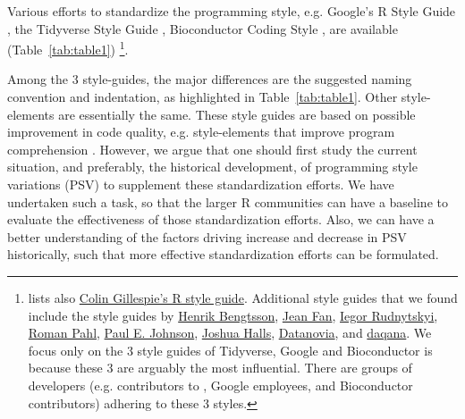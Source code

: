 Various efforts to standardize the programming style, e.g. Google's R Style Guide \citep{google}, the Tidyverse Style Guide \citep{tidyverse}, Bioconductor Coding Style \citep{bioconductor},  are available (Table~\ref{tab:table1}) \footnote{\citet{baaaath} lists also \href{https://csgillespie.wordpress.com/2010/11/23/r-style-guide/}{Colin Gillespie's R style guide}.  Additional style guides that we found include the style guides by \href{https://docs.google.com/document/d/1esDVxyWvH8AsX-VJa-8oqWaHLs4stGlIbk8kLc5VlII/edit}{Henrik Bengtsson}, \href{https://jef.works/R-style-guide/}{Jean Fan}, \href{https://irudnyts.github.io//r-coding-style-guide/}{Iegor Rudnytskyi}, \href{https://rpahl.github.io/r-some-blog/my-r-style-guide/}{Roman Pahl}, \href{https://cran.r-project.org/web/packages/rockchalk/vignettes/Rstyle.pdf}{Paul E. Johnson}, \href{https://bookdown.org/joshuah40/qa_code/Coding-Guidelines.html}{Joshua Halls},  \href{https://www.datanovia.com/en/blog/r-coding-style-best-practices/}{Datanovia}, and \href{https://www.daqana.org/dqstyle-r/}{daqana}. We focus only on the 3 style guides of Tidyverse, Google and Bioconductor is because these 3 are arguably the most influential. There are groups of developers (e.g. contributors to , Google employees, and Bioconductor contributors) adhering to these 3 styles.}.

Among the 3 style-guides, the major differences are the suggested naming convention and indentation, as highlighted in Table~\ref{tab:table1}. Other style-elements are essentially the same. These style guides are based on possible improvement in code quality, e.g. style-elements that improve program comprehension \citep{oman}. However, we argue that one should first study the current situation, and preferably, the historical development, of programming style variations (PSV) to supplement these standardization efforts. We have undertaken such a task, so that the larger R communities can have a baseline to evaluate the effectiveness of those standardization efforts. Also, we can have a better understanding of the factors driving increase and decrease in PSV historically, such that more effective standardization efforts can be formulated.


